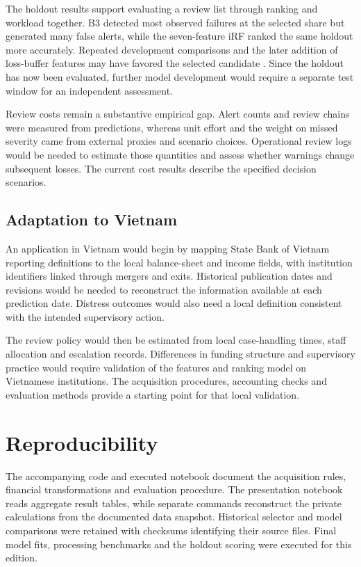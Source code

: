 \documentclass[11pt,a4paper]{article}
\begin{document}
The holdout results support evaluating a review list through ranking and workload together. B3 detected most observed failures at the selected share but generated many false alerts, while the seven-feature iRF ranked the same holdout more accurately. Repeated development comparisons and the later addition of loss-buffer features may have favored the selected candidate \citep{cawley}. Since the holdout has now been evaluated, further model development would require a separate test window for an independent assessment.

Review costs remain a substantive empirical gap. Alert counts and review chains were measured from predictions, whereas unit effort and the weight on missed severity came from external proxies and scenario choices. Operational review logs would be needed to estimate those quantities and assess whether warnings change subsequent losses. The current cost results describe the specified decision scenarios.

\subsection{Adaptation to Vietnam}
An application in Vietnam would begin by mapping State Bank of Vietnam reporting definitions to the local balance-sheet and income fields, with institution identifiers linked through mergers and exits. Historical publication dates and revisions would be needed to reconstruct the information available at each prediction date. Distress outcomes would also need a local definition consistent with the intended supervisory action.

The review policy would then be estimated from local case-handling times, staff allocation and escalation records. Differences in funding structure and supervisory practice would require validation of the features and ranking model on Vietnamese institutions. The acquisition procedures, accounting checks and evaluation methods provide a starting point for that local validation.

\section{Reproducibility}
The accompanying code and executed notebook document the acquisition rules, financial transformations and evaluation procedure. The presentation notebook reads aggregate result tables, while separate commands reconstruct the private calculations from the documented data snapshot. Historical selector and model comparisons were retained with checksums identifying their source files. Final model fits, processing benchmarks and the holdout scoring were executed for this edition.
\end{document}

